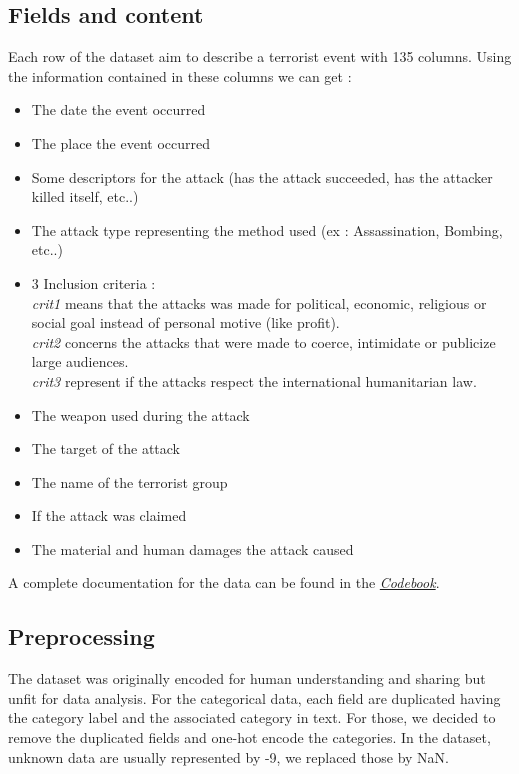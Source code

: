 \documentclass{article}
\begin{document}
\subsection{Fields and content}

Each row of the dataset aim to describe a terrorist event with 135 columns. Using the information contained in these columns we can get :
\begin{itemize}
    \item The date the event occurred
    \item The place the event occurred
    \item Some descriptors for the attack (has the attack succeeded, has the attacker killed itself, etc..)
    \item The attack type representing the method used (ex : Assassination, Bombing, etc..)
    \item 3 Inclusion criteria : \\
    \textit{crit1} means that the attacks was made for political, economic, religious or social goal instead of personal motive (like profit). \\
    \textit{crit2} concerns the attacks that were made to coerce, intimidate or publicize large audiences. \\
    \textit{crit3} represent if the attacks respect the international humanitarian law.
    \item The weapon used during the attack
    \item The target of the attack
    \item The name of the terrorist group
    \item If the attack was claimed
    \item The material and human damages the attack caused
\end{itemize}

A complete documentation for the data can be found in the 
\href{https://github.com/ekomlenovic/SecurityDataset/blob/main/data/Codebook.pdf}{\textit{Codebook}}.

\subsection{Preprocessing}
The dataset was originally encoded for human understanding and sharing but unfit for data analysis. For the categorical data, each field are duplicated having the category label and the associated category in text. For those, we decided to remove the duplicated fields and one-hot encode the categories.
In the dataset, unknown data are usually represented by -9, we replaced those by NaN.
\end{document}
